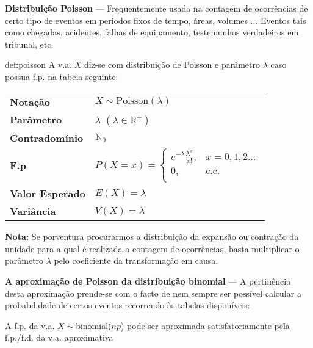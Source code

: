 \newpage
\noindent\textbf{Distribuição Poisson} --- Frequentemente usada na contagem de ocorrências de certo tipo de eventos em periodos fixos de tempo, áreas, volumes ... Eventos tais como chegadas, acidentes, falhas de equipamento, testemunhos verdadeiros em tribunal, etc.

\begin{theo}{def:poisson}\label{def:poisson}
\noindent A v.a. $X$ diz-se com distribuição de Poisson e parâmetro $\lambda$ caso possua f.p. na tabela seguinte:

\vspace{1 em}
\begin{center}
\begin{tabular}{p{4cm}p{8cm}}
\toprule
\textbf{Notação} & $X \sim \text{Poisson}(\lambda)$\\
\addlinespace
\textbf{Parâmetro} & $\lambda$ $(\lambda \in \mathbb{R}^+)$\\
\addlinespace
\textbf{Contradomínio} & $\mathbb{N}_0$\\
\addlinespace
\textbf{F.p} & $P(X = x)= \left\{
                                \begin{array}{ll}
                                       e^{-\lambda}\frac{\lambda^x}{x!}, & x = 0,1,2 \dots\\
                                       0, & \text{c.c.}\\
                                \end{array} 
                          \right.$\\
\addlinespace
\textbf{Valor Esperado} & $E(X) = \lambda$\\
\addlinespace
\textbf{Variância} & $V(X) = \lambda$\\
\bottomrule
\end{tabular}
\end{center}

\noindent\textbf{Nota:} Se porventura procurarmos a distribuição da expansão ou contração da unidade para a qual é realizada a contagem de ocorrências, basta multiplicar o parâmetro $\lambda$ pelo coeficiente da transformação em causa.
\end{theo}

\noindent\textbf{A aproximação de Poisson da distribuição binomial} --- A pertinência desta aproximação prende-se com o facto de nem sempre ser possível calcular a probabilidade de certos eventos recorrendo às tabelas disponíveis:

\vspace{1 em}
\noindent A f.p. da v.a. $X \sim$binomial($np$) pode ser aproximada satisfatoriamente pela f.p./f.d. da v.a. aproximativa

